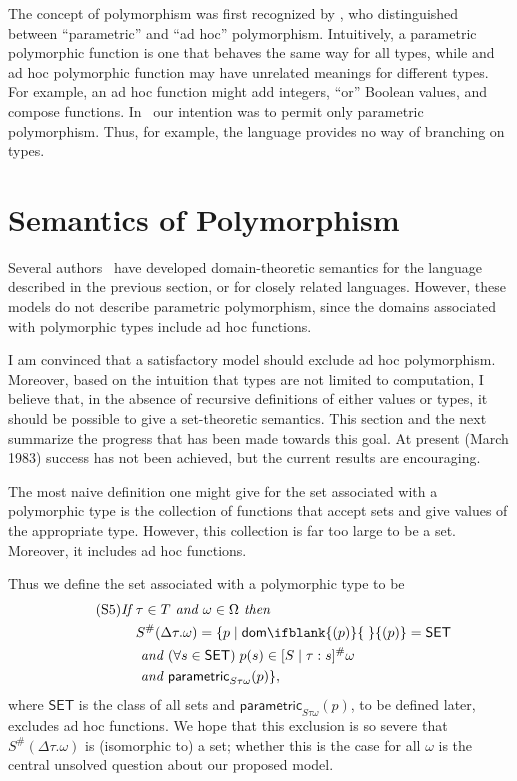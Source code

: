 \documentclass[sigplan,screen,nonacm,balance=false]{acmart}
\theoremstyle{plain}
\DeclarePairedDelimiter{\set}{\{}{\}}
\newcommand{\dom}[1]{\mathsf{dom}\ifblank{#1}{\;}{#1}}
\newcommand{\SET}{\mathsf{SET}}
\newcommand{\para}{\mathsf{parametric}}
\begin{document}
The concept of polymorphism was first recognized by \citet{fundamental}, who distinguished between ``parametric'' and ``ad hoc'' polymorphism.
Intuitively, a parametric polymorphic function is one that behaves the same way for all types, while and ad hoc polymorphic function may have unrelated meanings for different types.
For example, an ad hoc function might add integers, ``or'' Boolean values, and compose functions.
In~\citep{polymorphism} our intention was to permit only parametric polymorphism.
Thus, for example, the language provides no way of branching on types.

\section{Semantics of Polymorphism}

Several authors~\citep{polytype,retract,applicative,repindep,polydata} have developed domain-theoretic semantics for the language described in the previous section, or for closely related languages.
However, these models do not describe parametric polymorphism, since the domains associated with polymorphic types include ad hoc functions.

I am convinced that a satisfactory model should exclude ad hoc polymorphism.
Moreover, based on the intuition that types are not limited to computation, I believe that, in the absence of recursive definitions of either values or types, it should be possible to give a set-theoretic semantics.
This section and the next summarize the progress that has been made towards this goal.
At present (March 1983) success has not been achieved, but the current results are encouraging.

The most naive definition one might give for the set associated with a polymorphic type is the collection of functions that accept sets and give values of the appropriate type.
However, this collection is far too large to be a set.
Moreover, it includes ad hoc functions.

Thus we define the set associated with a polymorphic type to be
%
\begin{align*}\tag{S5}
  \textit{If } & \tau \in T \textit{ and } \omega \in \Omega \textit{ then } \\
  & S^\#(\Delta \tau. \omega) = \set{p \mid \dom{(p)} = \SET \\
  & \textit{ and } (\forall s \in \SET) \; p(s) \in [S \mid \tau: s]^\# \omega \\
  & \textit{ and } \para_{S \tau \omega}(p)},
\end{align*}
%
where $\SET$ is the class of all sets and $\para_{S \tau \omega}(p)$, to be defined later, excludes ad hoc functions.
We hope that this exclusion is so severe that $S^\#(\Delta \tau. \omega)$ is (isomorphic to) a set; whether this is the case for all $\omega$ is the central unsolved question about our proposed model.
\end{document}
